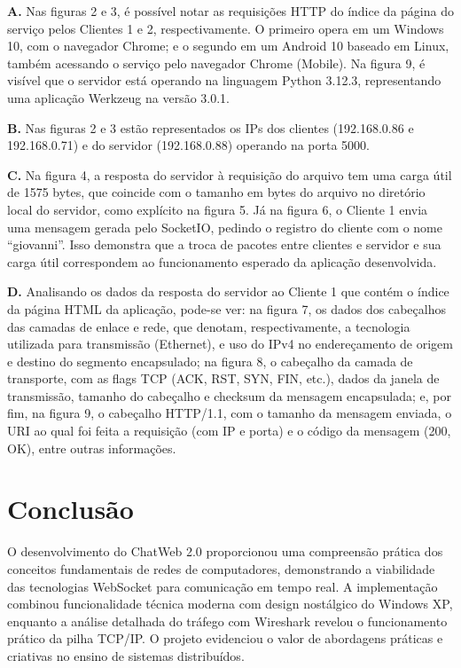 \documentclass[conference,compsoc]{IEEEtran}
\begin{document}
\begin{otherlanguage}{brazil}
\textbf{A.} Nas figuras 2 e 3, é possível notar as requisições HTTP do índice da página do serviço pelos Clientes 1 e 2, respectivamente. O primeiro opera em um Windows 10, com o navegador Chrome; e o segundo em um Android 10 baseado em Linux, também acessando o serviço pelo navegador Chrome (Mobile). Na figura 9, é visível que o servidor está operando na linguagem Python 3.12.3, representando uma aplicação Werkzeug na versão 3.0.1.

\textbf{B.} Nas figuras 2 e 3 estão representados os IPs dos clientes (192.168.0.86 e 192.168.0.71) e do servidor (192.168.0.88) operando na porta 5000.

\textbf{C.} Na figura 4, a resposta do servidor à requisição do arquivo tem uma carga útil de 1575 bytes, que coincide com o tamanho em bytes do arquivo no diretório local do servidor, como explícito na figura 5. Já na figura 6, o Cliente 1 envia uma mensagem gerada pelo SocketIO, pedindo o registro do cliente com o nome ``giovanni''. Isso demonstra que a troca de pacotes entre clientes e servidor e sua carga útil correspondem ao funcionamento esperado da aplicação desenvolvida.

\textbf{D.} Analisando os dados da resposta do servidor ao Cliente 1 que contém o índice da página HTML da aplicação, pode-se ver: na figura 7, os dados dos cabeçalhos das camadas de enlace e rede, que denotam, respectivamente, a tecnologia utilizada para transmissão (Ethernet), e uso do IPv4 no endereçamento de origem e destino do segmento encapsulado; na figura 8, o cabeçalho da camada de transporte, com as flags TCP (ACK, RST, SYN, FIN, etc.), dados da janela de transmissão, tamanho do cabeçalho e checksum da mensagem encapsulada; e, por fim, na figura 9, o cabeçalho HTTP/1.1, com o tamanho da mensagem enviada, o URI ao qual foi feita a requisição (com IP e porta) e o código da mensagem (200, OK), entre outras informações.


\section{Conclusão}

O desenvolvimento do ChatWeb 2.0 proporcionou uma compreensão prática dos conceitos fundamentais de redes de computadores, demonstrando a viabilidade das tecnologias WebSocket para comunicação em tempo real. A implementação combinou funcionalidade técnica moderna com design nostálgico do Windows XP, enquanto a análise detalhada do tráfego com Wireshark revelou o funcionamento prático da pilha TCP/IP. O projeto evidenciou o valor de abordagens práticas e criativas no ensino de sistemas distribuídos.


\end{otherlanguage}
\end{document}
